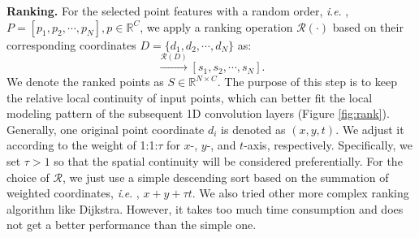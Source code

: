 \documentclass[journal]{IEEEtran}
\newcommand{\ie}{\textit{i}.\textit{e}. }
\begin{document}
\textbf{Ranking.}
For the selected point features with a random order, \ie, $P=[p_1,p_2,\cdots,p_N], p\in\mathbb{R}^C$, we apply a ranking operation $\mathcal{R}(\cdot)$ based on their corresponding coordinates $D=\{d_1,d_2,\cdots,d_N\}$ as:
\begin{equation}
	[p_1,p_2,\cdots,p_N]\overset{\mathcal{R}(D)}{\rightarrow}[s_1,s_2,\cdots,s_N].
\end{equation}
We denote the ranked points as $S\in \mathbb{R}^{N\times C}$.
The purpose of this step is to keep the relative local continuity of input points, which can better fit the local modeling pattern of the subsequent 1D convolution layers (Figure \ref{fig:rank}).
Generally, one original point coordinate $d_i$ is denoted as $(x,y,t)$.
We adjust it according to the weight of 1:1:$\tau$ for $x$-, $y$-, and $t$-axis, respectively.
Specifically, we set $\tau > 1$ so that the spatial continuity will be considered preferentially.
For the choice of $\mathcal{R}$, we just use a simple descending sort based on the summation of weighted coordinates, \ie, $x+y+\tau t$.
We also tried other more complex ranking algorithm like Dijkstra.
However, it takes too much time consumption and does not get a better performance than the simple one.
\end{document}
